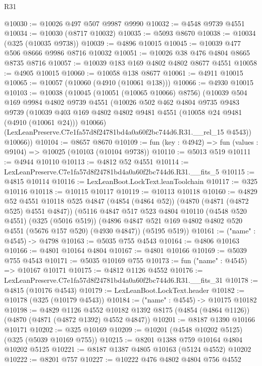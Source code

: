 \begin{lexlean}{R31}
\begin{coremodule}
@10030 := @10026 @497 @507 @9987 @9990
@10032 := @4548 @9739 @4551
@10034 := @10030 (@8717 @10032)
@10035 := @5093 @8670
@10038 := @10034 (@325 (@10035 @9738))
@10039 := @4896 @10015
@10045 := @10039 @477 @506 @8666 @9986 @8716 @10032
@10051 := @10026 @38 @476 @4804 @8665 @8735 @8716
@10057 := @10039 @183 @169 @4802 @4802 @8677 @4551
@10058 := @4905 @10015
@10060 := @10058 @138 @8677
@10061 := @4911 @10015
@10065 := @10057 (@10060 (@4910 (@10061 @138)))
@10066 := @4930 @10015
@10103 := @10038
    (@10045
      (@10051 (@10065 @10066) @8756)
      (@10039
        @504
        @169
        @9984
        @4802
        @9739
        @4551
        (@10026
          @502
          @462
          @4804
          @9735
          @9483
          @9739
          (@10039 @403 @169 @4802 @4802 @9481 @4551 (@10058 @24 @9481 (@4910 (@10061 @24))) @10066)
          (LexLeanPreserve.C7e1fa57d8f24781bd4a0a60f2bc744d6.R31.__rel_15 @4543))
        @10066))
@10104 := @8657 @8670
@10109 := fun (key : @4942) => fun (values : @9104) => @10025 (@10103 (@10104 @9738))
@10110 := @5013 @519
@10111 := @4944 @10110
@10113 := @4812 @52 @4551
@10114 := LexLeanPreserve.C7e1fa57d8f24781bd4a0a60f2bc744d6.R31.__fits_5
@10115 := @4815 @10114
@10116 := LexLeanBoot.LockText.leanToolchain
@10117 := @325 @10116
@10118 := @10115 @10117
@10119 := @10113 @10118
@10160 := @4829
    @52
    @4551
    @10118
    @525
    @4847
    (@4854 (@4864 @52))
    (@4870 (@4871 (@4872 @525) @4551 @4847))
    (@5116
      @4847
      @517
      @523
      @4804
      @10110
      (@4548 @520 @4551)
      (@325 (@5016 @519))
      (@4896 @4847 @521 @169 @4802 @4802 @520 @4551 (@5676 @157 @520) (@4930 @4847))
      (@5195 @519))
@10161 := ("name" : @4545) -> @4798
@10163 := @5035 @755 @4543
@10164 := @4806 @10163
@10166 := @4801 @10164 @4804
@10167 := @4801 @10166
@10169 := @5039 @755 @4543
@10171 := @5035 @10169 @755
@10173 := fun ("name" : @4545) => @10167 @10171
@10175 := @4812 @1126 @4552
@10176 := LexLeanPreserve.C7e1fa57d8f24781bd4a0a60f2bc744d6.R31.__fits_31
@10178 := @4815 (@10176 @4543)
@10179 := LexLeanBoot.LockText.header
@10182 := @10178 (@325 (@10179 @4543))
@10184 := ("name" : @4545) -> @10175 @10182
@10198 := @4829
    @1126
    @4552
    @10182
    @1392
    @8175
    (@4854 (@4864 @1126))
    (@4870 (@4871 (@4872 @1392) @4552 @4847))
@10201 := @8187 @1390 @10166 @10171
@10202 := @325 @10169
@10209 := @10201 (@4548 @10202 @5125) (@325 (@5039 @10169 @755))
@10215 := @8201 @1388 @759 @10164 @4804 @10202 @5125
@10221 := @8187 @1387 @4805 @10163 (@5124 @4552) @10202
@10222 := @8201 @757
@10227 := @10222 @476 @4802 @4804 @756 @4552

\end{coremodule}
\end{lexlean}
